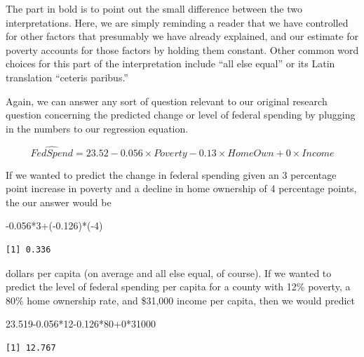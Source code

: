 \documentclass[
]{book}
\makeatletter
\newenvironment{Shaded}{\begin{snugshade}}{\end{snugshade}}
\newcommand{\DecValTok}[1]{\textcolor[rgb]{0.06,0.06,0.06}{#1}}
\newcommand{\FloatTok}[1]{\textcolor[rgb]{0.06,0.06,0.06}{#1}}
\newcommand{\NormalTok}[1]{#1}
\newcommand{\SpecialCharTok}[1]{\textcolor[rgb]{0,0,0}{#1}}
\newenvironment{kframe}{%
\medskip{}
\setlength{\fboxsep}{.8em}
 \def\at@end@of@kframe{}%
 \ifinner\ifhmode%
  \def\at@end@of@kframe{\end{minipage}}%
  \begin{minipage}{\columnwidth}%
 \fi\fi%
 \def\FrameCommand##1{\hskip\@totalleftmargin \hskip-\fboxsep
 \colorbox{shadecolor}{##1}\hskip-\fboxsep
     \hskip-\linewidth \hskip-\@totalleftmargin \hskip\columnwidth}%
 \MakeFramed {\advance\hsize-\width
   \@totalleftmargin\z@ \linewidth\hsize
   \@setminipage}}%
 {\par\unskip\endMakeFramed%
 \at@end@of@kframe}
\renewenvironment{Shaded}{\begin{kframe}}{\end{kframe}}
\makeatother
\begin{document}
The part in bold is to point out the small difference between the two interpretations. Here, we are simply reminding a reader that we have controlled for other factors that presumably we have already explained, and our estimate for poverty accounts for those factors by holding them constant. Other common word choices for this part of the interpretation include ``all else equal'' or its Latin translation ``ceteris paribus.''

Again, we can answer any sort of question relevant to our original research question concerning the predicted change or level of federal spending by plugging in the numbers to our regression equation.

\begin{equation}
\hat{FedSpend} = 23.52 - 0.056 \times Poverty - 0.13 \times HomeOwn + 0 \times Income
\end{equation}

If we wanted to predict the change in federal spending given an 3 percentage point increase in poverty and a decline in home ownership of 4 percentage points, the our answer would be

\begin{Shaded}
\begin{Highlighting}[]
\SpecialCharTok{{-}}\FloatTok{0.056}\SpecialCharTok{*}\DecValTok{3}\SpecialCharTok{+}\NormalTok{(}\SpecialCharTok{{-}}\FloatTok{0.126}\NormalTok{)}\SpecialCharTok{*}\NormalTok{(}\SpecialCharTok{{-}}\DecValTok{4}\NormalTok{)}
\end{Highlighting}
\end{Shaded}

\begin{verbatim}
[1] 0.336
\end{verbatim}

dollars per capita (on average and all else equal, of course). If we wanted to predict the level of federal spending per capita for a county with 12\% poverty, a 80\% home ownership rate, and \$31,000 income per capita, then we would predict

\begin{Shaded}
\begin{Highlighting}[]
\FloatTok{23.519{-}0.056}\SpecialCharTok{*}\DecValTok{12}\FloatTok{{-}0.126}\SpecialCharTok{*}\DecValTok{80}\SpecialCharTok{+}\DecValTok{0}\SpecialCharTok{*}\DecValTok{31000}
\end{Highlighting}
\end{Shaded}

\begin{verbatim}
[1] 12.767
\end{verbatim}
\end{document}
